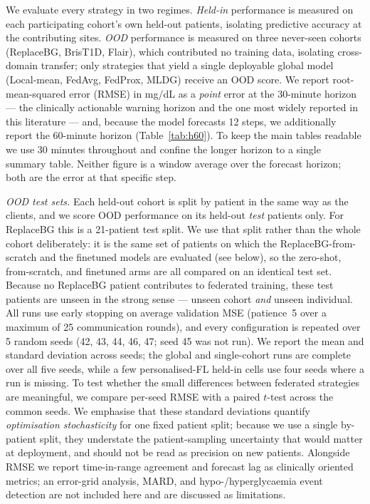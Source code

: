 \documentclass[10pt,letterpaper]{article}
\begin{document}
We evaluate every strategy in two regimes. \emph{Held-in} performance is measured
on each participating cohort's own held-out patients, isolating predictive
accuracy at the contributing sites. \emph{OOD} performance is measured on three
never-seen cohorts (ReplaceBG, BrisT1D, Flair), which contributed no training
data, isolating cross-domain transfer; only strategies that yield a single
deployable global model (Local-mean, FedAvg, FedProx, MLDG) receive an OOD score.
We report root-mean-squared error (RMSE) in mg/dL as a \emph{point} error at the
30-minute horizon --- the clinically actionable warning horizon and the one most
widely reported in this literature --- and, because the model forecasts 12 steps,
we additionally report the 60-minute horizon (Table~\ref{tab:h60}). To keep the
main tables readable we use 30 minutes throughout and confine the longer horizon
to a single summary table. Neither figure is a window average over the forecast
horizon; both are the error at that specific step.

\emph{OOD test sets.} Each held-out cohort is split by patient in the same way as
the clients, and we score OOD performance on its held-out \emph{test} patients
only. For ReplaceBG this is a 21-patient test split. We use that split rather than
the whole cohort deliberately: it is the same set of patients on which the
ReplaceBG-from-scratch and the finetuned models are evaluated (see below), so the
zero-shot, from-scratch, and finetuned arms are all compared on an identical test
set. Because no ReplaceBG patient contributes to federated training, these test
patients are unseen in the strong sense --- unseen cohort \emph{and} unseen
individual. All runs use early stopping on average validation MSE (patience~5 over a
maximum of 25 communication rounds), and every configuration is repeated over 5
random seeds (42, 43, 44, 46, 47; seed 45 was not run). We report the mean and
standard deviation across seeds; the global and single-cohort runs are complete
over all five seeds, while a few personalised-FL held-in cells use four seeds
where a run is missing. To test whether the small differences between federated
strategies are meaningful, we compare per-seed RMSE with a paired $t$-test across
the common seeds. We emphasise that these standard deviations quantify
\emph{optimisation stochasticity} for one fixed patient split; because we use a
single by-patient split, they understate the patient-sampling uncertainty that
would matter at deployment, and should not be read as precision on new patients.
Alongside RMSE we report time-in-range agreement and forecast lag as
clinically oriented metrics; an error-grid analysis, MARD, and
hypo-/hyperglycaemia event detection are not included here and are discussed as
limitations.
\end{document}
